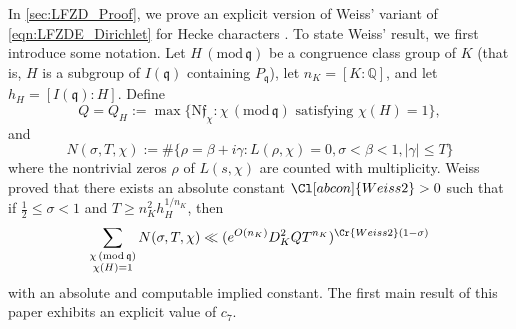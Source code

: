 \documentclass[12pt,psamsfonts]{amsart}
\newtheorem{thm}{Theorem}[section]
\theoremstyle{definition}
\theoremstyle{remark}
\numberwithin{equation}{section}
\newcounter{notation}
\theoremstyle{plain}
\theoremstyle{remark}
\renewcommand{\1}{ {\bf 1}}
\newcommand{\kf}{\mathfrak{f}}
\renewcommand{\pmod}[1]{\, (\mathrm{mod} {\, #1})}
\newcommand{\N}{\mathrm{N}}
\newcommand{\kq}{\mathfrak{q}}
\newcommand{\Q}{\mathbb{Q}}
\begin{document}

In \cref{sec:LFZD_Proof}, we prove an explicit version of Weiss' variant of \eqref{eqn:LFZDE_Dirichlet} for Hecke characters \cite[Corollary 4.4]{Weiss}.  To state Weiss' result, we first introduce some notation.  Let $H \pmod{\kq}$ be a congruence class group of $K$ (that is, $H$ is a subgroup of $I(\kq)$ containing $P_{\kq}$), let $n_K=[K:\Q]$, and let $h_H=[I(\kq):H]$.  Define
\begin{equation}
	Q = Q_H := \max\{ \N\kf_{\chi} : \chi \pmod{\kq} \text{ satisfying } \chi(H) = 1\},
	\label{def:Q}
\end{equation}
and
\[
N(\sigma,T,\chi) := \#\{ \rho = \beta+i\gamma : L(\rho, \chi) = 0, \sigma < \beta < 1, |\gamma| \leq T \}
\]
where the nontrivial zeros $\rho$ of $L(s,\chi)$ are counted with multiplicity.  Weiss \cite[Corollary 4.4]{Weiss} proved that there exists an absolute constant $\Cl[abcon]{Weiss2}>0$ such that if $\tfrac{1}{2} \leq \sigma < 1$ and $T \geq n_K^2 h_H^{1/n_K}$, then
\begin{equation}
\sum_{\substack{\chi\pmod{\kq}\\ \chi(H) = 1}} N(\sigma, T,\chi) \ll (e^{O(n_K)}D_K^2 Q T^{n_K})^{\Cr{Weiss2}(1-\sigma)}
\label{eqn:WeissDensity}
\end{equation}
with an absolute and computable implied constant. The first main result of this paper exhibits an explicit value of $c_7$.
\end{document}
